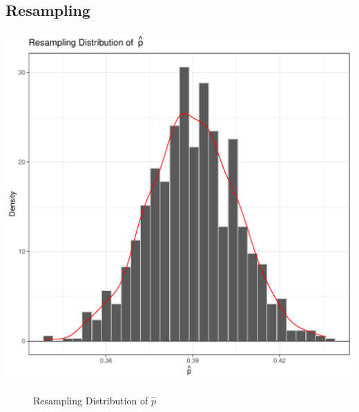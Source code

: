 \documentclass{article}\usepackage[]{graphicx}\usepackage[]{xcolor}
\makeatletter
\def\maxwidth{ %
  \ifdim\Gin@nat@width>\linewidth
    \linewidth
  \else
    \Gin@nat@width
  \fi
}
\newenvironment{knitrout}{}{} %
\makeatother
\begin{document}
\subsection{Resampling}
\begin{knitrout}\scriptsize
{}\color{fgcolor}
\includegraphics[width=\maxwidth]{figure/plot2-1} 
\end{knitrout}
\begin{figure}[H]
\begin{center}

\caption{Resampling Distribution of $\hat{p}$}
\label{resamplingplot} %
\end{center}
\end{figure}

\pagebreak
\end{document}
